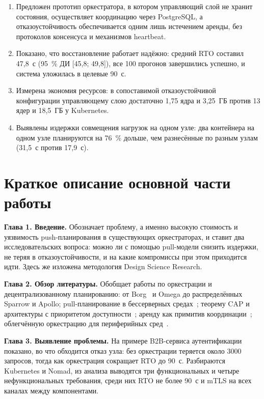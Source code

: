 \documentclass[oneside,final,14pt,a4paper]{extreport}
\begin{document}
\begin{enumerate}[left=0pt]
\item Предложен прототип оркестратора, в котором управляющий слой не хранит
состояния, осуществляет координацию через PostgreSQL, а отказоустойчивость
обеспечивается одним лишь истечением аренды, без протоколов консенсуса и
механизмов heartbeat.
\item Показано, что восстановление работает надёжно: средний RTO составил
47{,}8~с (95~\% ДИ [45{,}8; 49{,}8]), все 100 прогонов завершились успешно, и
система уложилась в целевые 90~с.
\item Измерена экономия ресурсов: в сопоставимой отказоустойчивой конфигурации
управляющему слою достаточно 1{,}75 ядра и 3{,}25~ГБ против 13 ядер и 18{,}5~ГБ у
Kubernetes.
\item Выявлены издержки совмещения нагрузок на одном узле: два контейнера на одном
узле планируются на 76~\% дольше, чем разнесённые по разным узлам (31{,}5~с против
17{,}9~с).
\end{enumerate}

\chapter*{Краткое описание основной части работы}

\textbf{Глава 1. Введение.} Обозначает проблему, а именно высокую стоимость и
уязвимость push-планирования в существующих оркестраторах, и ставит два
исследовательских вопроса: можно ли с помощью pull-модели снизить издержки, не
теряя в отказоустойчивости, и на какие компромиссы при этом приходится идти. Здесь
же изложена методология Design Science Research.

\textbf{Глава 2. Обзор литературы.} Обобщает работы по оркестрации и
децентрализованному планированию: от Borg~\cite{verma2015borg} и Omega до
распределённых Sparrow и Apollo; pull-планирование в бессерверных
средах~\cite{hiku2025pull}; теорему CAP и архитектуры с приоритетом
доступности~\cite{brewer2012cap, decandia2007dynamo}; аренду как примитив
координации~\cite{gray1989leases}; облегчённую оркестрацию для
периферийных сред~\cite{cilic2023edgeeval}.

\textbf{Глава 3. Выявление проблемы.} На примере B2B-сервиса аутентификации
показано, во что обходится отказ узла: без оркестрации теряется около 3000
запросов, тогда как оркестрация сокращает RTO до 90~с. Разбираются Kubernetes и
Nomad, из анализа выводятся три функциональных и четыре нефункциональных
требования, среди них RTO не более 90~с и mTLS на всех каналах между
компонентами.
\end{document}
